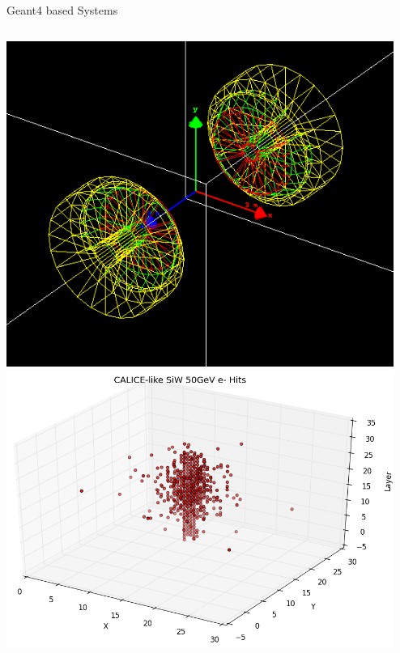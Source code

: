 \documentclass[pdf, 9pt]{beamer}
\begin{document}
\begin{frame}{Geant4 based Systems}
\begin{columns}[T]
\begin{column}{0.33\textwidth}
        \includegraphics[width=0.99\textwidth, height=0.3\textheight]{figs/siw/HGC_45_45.png}\\ \vspace{0.3cm}
        \includegraphics[width=0.99\textwidth, height=0.4\textheight]{figs/scatter_3d/scatter_3D_50GeV.png}
      \end{column}
      \begin{column}{0.33\textwidth}

\end{column}
\end{columns}
\end{frame}
\end{document}
